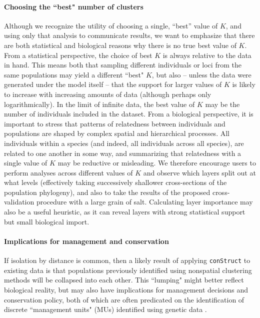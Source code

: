 \documentclass[12pt]{article}
\begin{document}
\paragraph{Choosing the ``best" number of clusters}
Although we recognize the utility of choosing a single, ``best'' value of $K$, 
and using only that analysis to communicate results, 
we want to emphasize that there are both statistical and biological reasons 
why there is no true best value of $K$.
From a statistical perspective, the choice of best $K$ is always relative to the data in hand.
This means both that sampling different individuals or loci 
from the same populations may yield a different ``best" $K$, 
but also 
-- unless the data were generated under the model itself --
that the support for larger values of $K$ is likely to increase with increasing amounts of data
(although perhaps only logarithmically).
In the limit of infinite data, the best value of $K$ 
may be the number of individuals included in the dataset.
From a biological perspective, 
it is important to stress that patterns of relatedness between individuals and populations 
are shaped by complex spatial and hierarchical processes.
All individuals within a species (and indeed, all individuals across all species), 
are related to one another in some way, 
and summarizing that relatedness with a single value of $K$ may be reductive or misleading.
We therefore encourage users to perform analyses across different values of $K$ and 
observe which layers split out at what levels 
(effectively taking successively shallower cross-sections of the population phylogeny),
and also to take the results of the proposed cross-validation procedure with a large grain of salt.
Calculating layer importance may also be a useful heuristic, 
as it can reveal layers with strong statistical support but small biological import.

\paragraph{Implications for management and conservation}
If isolation by distance is common, 
then a likely result of applying \texttt{conStruct} to existing data is that 
populations previously identified using nonspatial clustering methods 
will be collapsed into each other.  
This ``lumping" might better reflect biological reality, 
but may also have implications for management decisions and conservation policy, 
both of which are often predicated on the identification of discrete ``management units" (MUs) 
identified using genetic data \citep{Moritz1994,Waples_1998,Moritz_etal_2002}.
\end{document}
